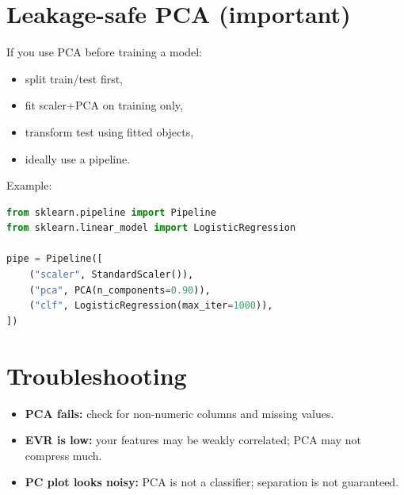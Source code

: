 \documentclass[11pt]{article}
\begin{document}
\section{Leakage-safe PCA (important)}
If you use PCA before training a model:
\begin{itemize}[leftmargin=*]
  \item split train/test first,
  \item fit scaler+PCA on training only,
  \item transform test using fitted objects,
  \item ideally use a pipeline.
\end{itemize}
Example:
\begin{lstlisting}[language=Python]
from sklearn.pipeline import Pipeline
from sklearn.linear_model import LogisticRegression

pipe = Pipeline([
    ("scaler", StandardScaler()),
    ("pca", PCA(n_components=0.90)),
    ("clf", LogisticRegression(max_iter=1000)),
])
\end{lstlisting}

\section{Troubleshooting}
\begin{itemize}[leftmargin=*]
  \item \textbf{PCA fails:} check for non-numeric columns and missing values.
  \item \textbf{EVR is low:} your features may be weakly correlated; PCA may not compress much.
  \item \textbf{PC plot looks noisy:} PCA is not a classifier; separation is not guaranteed.
\end{itemize}

\notesources{\AIMLLabSources}
\end{document}
